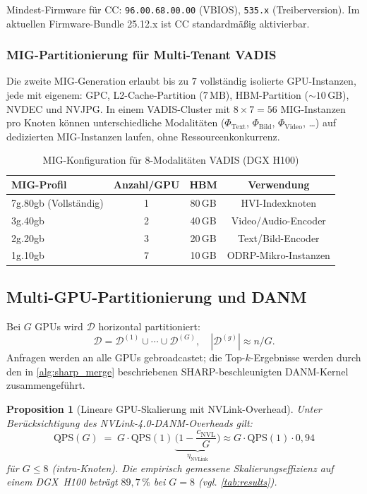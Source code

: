 ﻿\documentclass[12pt,a4paper]{article}
\newtheorem{proposition}[theorem]{Proposition}
\begin{document}
Mindest-Firmware für CC: \texttt{96.00.68.00.00} (VBIOS),
\texttt{535.x} (Treiberversion). Im aktuellen
Firmware-Bundle 25.12.x ist CC standardmäßig aktivierbar.

\subsubsection{MIG-Partitionierung für Multi-Tenant VADIS}

Die zweite MIG-Generation erlaubt bis zu $7$ vollständig
isolierte GPU-Instanzen, jede mit eigenem:
GPC, L2-Cache-Partition ($7\,\text{MB}$), HBM-Partition
($\sim 10\,\text{GB}$), NVDEC und NVJPG. In einem
VADIS-Cluster mit $8 \times 7 = 56$ MIG-Instanzen pro Knoten
können unterschiedliche Modalitäten ($\Phi_{\text{Text}}$,
$\Phi_{\text{Bild}}$, $\Phi_{\text{Video}}$, \ldots) auf
dedizierten MIG-Instanzen laufen, ohne Ressourcenkonkurrenz.

\begin{table}[ht]
\centering
\small
\caption{MIG-Konfiguration für 8-Modalitäten VADIS (DGX H100)}
\label{tab:mig}
\begin{tabular}{@{}lccc@{}}
\toprule
\textbf{MIG-Profil} & \textbf{Anzahl/GPU} & \textbf{HBM} & \textbf{Verwendung} \\
\midrule
7g.80gb (Vollständig) & 1 & 80\,GB & HVI-Indexknoten \\
3g.40gb & 2 & 40\,GB & Video/Audio-Encoder \\
2g.20gb & 3 & 20\,GB & Text/Bild-Encoder \\
1g.10gb & 7 & 10\,GB & ODRP-Mikro-Instanzen \\
\bottomrule
\end{tabular}
\end{table}

\subsection{Multi-GPU-Partitionierung und DANM}
\label{sub:multigpu}

Bei $G$ GPUs wird $\mathcal{D}$ horizontal partitioniert:
\[
  \mathcal{D} = \mathcal{D}^{(1)} \cup \cdots \cup \mathcal{D}^{(G)},
  \quad |\mathcal{D}^{(g)}| \approx n/G.
\]
Anfragen werden an alle GPUs gebroadcastet; die Top-$k$-Ergebnisse
werden durch den in \cref{alg:sharp_merge} beschriebenen
SHARP-beschleunigten DANM-Kernel zusammengeführt.

\begin{proposition}[Lineare GPU-Skalierung mit NVLink-Overhead]
\label{prop:gpulin}
Unter Berücksichtigung des NVLink-4.0-DANM-Overheads gilt:
\[
  \text{QPS}(G) \;=\; G \cdot \text{QPS}(1)\,
  \underbrace{\bigl(1 - \frac{c_{\text{NVL}}}{G}\bigr)}_{\eta_{\text{NVLink}}}
  \approx G \cdot \text{QPS}(1) \cdot 0{,}94
\]
für $G \leq 8$ (intra-Knoten). Die empirisch gemessene
Skalierungseffizienz auf einem DGX~H100 beträgt
$89{,}7\,\%$ bei $G=8$ (vgl. \cref{tab:results}).
\end{proposition}
\end{document}
